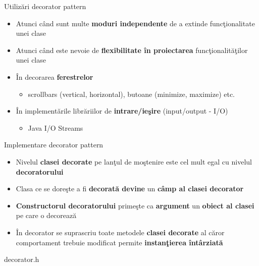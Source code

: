 \documentclass{beamer}
\begin{document}
\begin{frame}{Utilizări decorator pattern}
	\begin{itemize}
		\item Atunci când sunt multe \textbf{moduri independente} de a extinde funcţionalitate unei clase
		\vspace{4mm}
		\item Atunci când este nevoie de \textbf{flexibilitate în proiectarea} funcţionalităţilor unei clase
		\vspace{4mm}
		\item În decorarea \textbf{ferestrelor}
			\begin{itemize}
				\item scrollbars (vertical, horizontal), butoane (minimize, maximize) etc.
			\end{itemize}
		\vspace{4mm}
		\item În implementările librăriilor de \textbf{intrare/ieşire} (input/output - I/O)
			\begin{itemize}
				\item Java I/O Streams
			\end{itemize}
	\end{itemize}
\end{frame}

\begin{frame}{Implementare decorator pattern}
	\begin{itemize}
		\item Nivelul \textbf{clasei decorate} pe lanţul de moştenire este cel mult egal cu nivelul \textbf{decoratorului}
		\vspace{4mm}
		\item Clasa ce se doreşte a fi \textbf{decorată devine} un \textbf{câmp al clasei decorator}
		\vspace{4mm}
		\item \textbf{Constructorul decoratorului} primeşte ca \textbf{argument} un \textbf{obiect al clasei} pe care o decorează
		\vspace{4mm}
		\item În decorator se suprascriu toate metodele \textbf{clasei decorate} al căror comportament trebuie modificat
		\vspace{4mm} permite \textbf{instanţierea întârziată}
	\end{itemize}
\end{frame}

\begin{frame}{decorator.h}
	\footnotesize{}
\end{frame}
\end{document}
